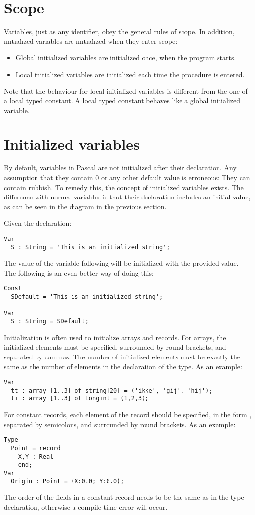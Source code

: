 \section{Scope}
Variables, just as any identifier, obey the general rules of scope. 
In addition, initialized variables are initialized when they enter scope:
\begin{itemize}
\item Global initialized variables are initialized once, when the program starts.
\item Local initialized variables are initialized each time the procedure is
entered.
\end{itemize}
Note that the behaviour for local initialized variables is different from
the one of a local typed constant. A local typed constant behaves like a
global initialized variable.

\section{Initialized variables}
\label{se:initializedvars}
By default, variables in Pascal are not initialized after their declaration.
Any assumption that they contain 0 or any other default value is erroneous:
They can contain rubbish. To remedy this, the concept of initialized variables 
exists. The difference with normal variables is that their declaration includes 
an initial value, as can be seen in the diagram in the previous section.

Given the declaration:
\begin{verbatim}
Var
  S : String = 'This is an initialized string';
\end{verbatim}
The value of the variable following will be initialized with the provided
value. The following is an even better way of doing this:
\begin{verbatim}
Const
  SDefault = 'This is an initialized string';

Var
  S : String = SDefault;
\end{verbatim}
Initialization is often used to initialize arrays and records. For arrays,
the initialized elements must be specified, surrounded by round brackets, and
separated by commas. The number of initialized elements must be exactly the 
same as the number of elements in the declaration of the type.
As an example:
\begin{verbatim}
Var
  tt : array [1..3] of string[20] = ('ikke', 'gij', 'hij');
  ti : array [1..3] of Longint = (1,2,3);
\end{verbatim}
For constant records, each element of the record should be specified, in
the form , separated by semicolons, and surrounded by round
brackets.
As an example:
\begin{verbatim}
Type
  Point = record
    X,Y : Real
    end;
Var
  Origin : Point = (X:0.0; Y:0.0);
\end{verbatim}
The order of the fields in a constant record needs to be the same as in the type 
declaration, otherwise a compile-time error will occur.

